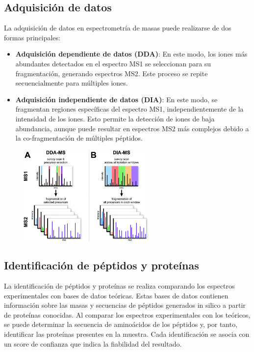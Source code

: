\subsection{Adquisición de datos}
La adquisición de datos en espectrometría de masas puede realizarse de dos formas principales:
\begin{itemize}
\item \textbf{Adquisición dependiente de datos (DDA)}: En este modo, los iones más abundantes detectados en el espectro MS1 se seleccionan para su fragmentación, generando espectros MS2. Este proceso se repite secuencialmente para múltiples iones.
\item \textbf{Adquisición independiente de datos (DIA)}: En este modo, se fragmentan regiones específicas del espectro MS1, independientemente de la intensidad de los iones. Esto permite la detección de iones de baja abundancia, aunque puede resultar en espectros MS2 más complejos debido a la co-fragmentación de múltiples péptidos.
\end{itemize}

\begin{figure}[h]
\centering
\includegraphics[width = 0.6\textwidth]{figs/data-adquisition.png}
\end{figure}

\subsection{Identificación de péptidos y proteínas}
La identificación de péptidos y proteínas se realiza comparando los espectros experimentales con bases de datos teóricas. Estas bases de datos contienen información sobre las masas y secuencias de péptidos generados in silico a partir de proteínas conocidas. Al comparar los espectros experimentales con los teóricos, se puede determinar la secuencia de aminoácidos de los péptidos y, por tanto, identificar las proteínas presentes en la muestra. Cada identificación se asocia con un score de confianza que indica la fiabilidad del resultado.

